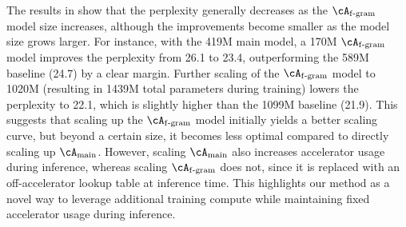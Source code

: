 The results in  show that the perplexity generally decreases as the $\Afgram$ model size increases, although the improvements become smaller as the model size grows larger. For instance, with the 419M main model, a 170M $\Afgram$ model improves the perplexity from 26.1 to 23.4, outperforming the 589M baseline (24.7) by a clear margin. Further scaling of the $\Afgram$ model to 1020M (resulting in 1439M total parameters during training) lowers the perplexity to 22.1, which is slightly higher than the 1099M baseline (21.9). This suggests that scaling up the $\Afgram$ model initially yields a better scaling curve, but beyond a certain size, it becomes less optimal compared to directly scaling up $\Amain$. However, scaling $\Amain$ also increases accelerator usage during inference, whereas scaling $\Afgram$ does not, since it is replaced with an off-accelerator lookup table at inference time. This highlights our method as a novel way to leverage additional training compute while maintaining fixed accelerator usage during inference.
